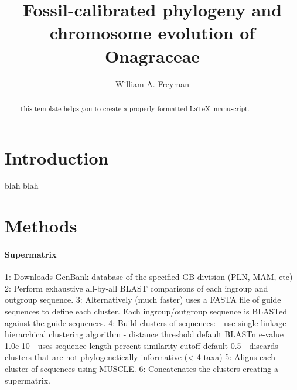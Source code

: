 \documentclass[review]{elsarticle}
\begin{document}
\begin{frontmatter}

\title{Fossil-calibrated phylogeny and chromosome evolution of Onagraceae}

\author[berk]{William A. Freyman}

\address[berk]{Jepson Herbarium and Department of Integrative Biology, University of California, Berkeley}

\begin{abstract}
This template helps you to create a properly formatted \LaTeX\ manuscript.
\end{abstract}


\end{frontmatter}

\linenumbers

\section{Introduction}

blah blah

\section{Methods}

\paragraph{Supermatrix} 

1: Downloads GenBank database of the specified GB division (PLN, MAM, etc)
2: Perform exhaustive all-by-all BLAST comparisons of each ingroup and outgroup sequence.
3: Alternatively (much faster) uses a FASTA file of guide sequences to define each cluster.
   Each ingroup/outgroup sequence is BLASTed against the guide sequences.
   4: Build clusters of sequences:
           - use single-linkage hierarchical clustering algorithm
	           - distance threshold default BLASTn e-value 1.0e-10
		           - uses sequence length percent similarity cutoff default 0.5
			           - discards clusters that are not phylogenetically informative (< 4 taxa)
				   5: Aligns each cluster of sequences using MUSCLE.
				   6: Concatenates the clusters creating a supermatrix.
\end{document}

